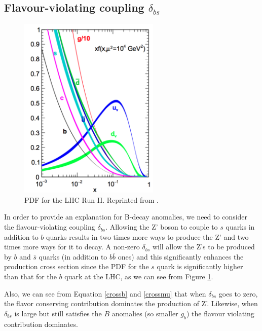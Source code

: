 \subsection{Flavour-violating coupling $\delta_{bs}$}

\begin{figure}[h]
 	\centering
 	\includegraphics[width=0.6\textwidth]{figures/pdfs.png}
 	\singlespace
 	\caption{PDF for the LHC Run II. Reprinted from \cite{Ball:2014uwa}.}
 	\label{fig:pdfs1}
 \end{figure}

In order to provide an explanation for B-decay anomalies, we need to consider the flavour-violating coupling $\delta_{bs}$. Allowing the Z' boson to couple to $s$ quarks in addition to $b$ quarks results in two times more ways to produce the Z' and two times more ways for it to decay. A non-zero $\delta_{bs}$ will allow the Z's to be produced by $b$ and $\bar{s}$ quarks (in addition to $b\bar{b}$ ones) and this significantly enhances the production cross section since the PDF for the $s$ quark is significantly higher than that for the $b$ quark at the LHC, as we can see from Figure \ref{fig:pdfs1}.

Also, we can see from Equation \ref{crossb} and \ref{crossmu} that when $\delta_{bs}$ goes to zero, the flavor conserving contribution dominates the production of Z'. Likewise, when $\delta_{bs}$ is large but still satisfies the $B$ anomalies (so smaller $g_{b}$) the flavour violating contribution dominates.

